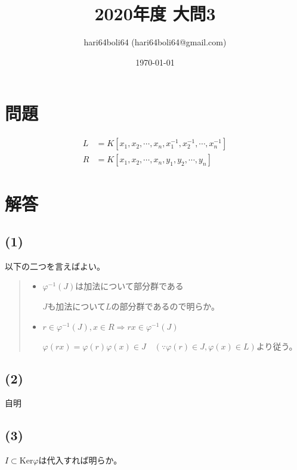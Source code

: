 \documentclass[a4paper, 10pt, dvipdfmx]{jlreq}
\begin{document}
\title{2020年度 大問3}
\author{hari64boli64 (hari64boli64@gmail.com)}
\date{\today}
\maketitle


\section{問題}

\begin{align*}
  L & =K[x_1,x_2,\cdots ,x_n, x_1^{-1},x_2^{-1},\cdots ,x_n^{-1}] \\
  R & =K[x_1,x_2,\cdots ,x_n, y_1,y_2,\cdots ,y_n]
\end{align*}

\section{解答}

\subsection*{(1)}

以下の二つを言えばよい。

\begin{quote}
  \begin{itemize}
    \item  $\varphi^{-1}(J)$は加法について部分群である

          $J$も加法について$L$の部分群であるので明らか。

    \item $r \in \varphi^{-1}(J),x \in R \Rightarrow rx \in \varphi^{-1}(J)$

          $\varphi(rx)=\varphi(r)\varphi(x)\in J \quad (\because \varphi(r) \in J , \varphi(x) \in L)$より従う。
  \end{itemize}
\end{quote}


\subsection*{(2)}

自明

\subsection*{(3)}

$I \subset \mathrm{Ker}\varphi$は代入すれば明らか。
\end{document}
